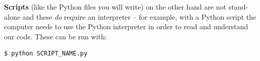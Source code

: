 \documentclass{tufte-book}
\begin{document}
\textbf{Scripts} (like the Python files you will write) on the other hand are not stand-alone and these \textit{do} require an interpreter -- for example, with a Python script the computer needs to use the Python interpreter in order to read and understand our code. These can be run with:
\begin{lstlisting}[backgroundcolor=\color{lightgray}]
$ python SCRIPT_NAME.py
\end{lstlisting}






\end{document}
